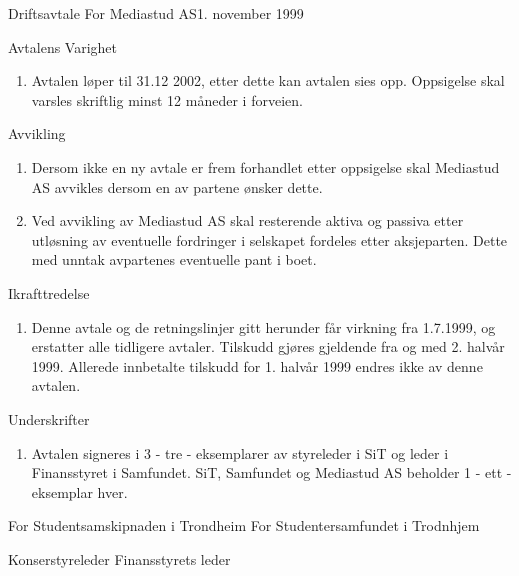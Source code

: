 \begin{instruks}{Driftsavtale For Mediastud AS}{1. november 1999}{}
	\begin{instruksledd}{Avtalens Varighet}
		\begin{enumerate}
		\item Avtalen løper til 31.12 2002, etter dette kan avtalen sies
		opp. Oppsigelse skal varsles skriftlig minst 12
		måneder i forveien.
		\end{enumerate}
	\end{instruksledd}

	\begin{instruksledd}{Avvikling}
		\begin{enumerate}
		\item Dersom ikke en ny avtale er frem forhandlet etter
		oppsigelse skal Mediastud AS avvikles dersom en av
		partene ønsker dette.
		\item Ved avvikling av Mediastud AS skal resterende aktiva og
		passiva etter utløsning av eventuelle fordringer i
		selskapet fordeles etter aksjeparten. Dette med unntak
		avpartenes eventuelle pant i boet.
		\end{enumerate}
	\end{instruksledd}

	\begin{instruksledd}{Ikrafttredelse}
		\begin{enumerate}
		\item Denne avtale og de retningslinjer gitt herunder får
		virkning fra 1.7.1999, og erstatter alle tidligere avtaler.
		Tilskudd gjøres gjeldende fra og med 2. halvår 1999. Allerede
		innbetalte tilskudd for 1. halvår 1999 endres
		ikke av denne avtalen.
		\end{enumerate}
	\end{instruksledd}

	\begin{instruksledd}{Underskrifter}
		\begin{enumerate}
		\item Avtalen signeres i 3 - tre - eksemplarer av styreleder i
		SiT og leder i Finansstyret i Samfundet. SiT,
		Samfundet og Mediastud AS beholder 1 - ett - eksemplar hver.
		\end{enumerate}
		\end{instruksledd}

\vfill
For Studentsamskipnaden i Trondheim 	\hfill	For Studentersamfundet i Trodnhjem

Konserstyreleder \hfill		Finansstyrets leder


\end{instruks}

